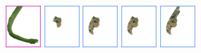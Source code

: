 \begin{figure}[p]
\includegraphics[width=0.118\textwidth]{figs/snake_t3.png}
\includegraphics[width=0.118\textwidth]{figs/bg_t1.png}
\includegraphics[width=0.118\textwidth]{figs/bg_t2.png}
\includegraphics[width=0.118\textwidth]{figs/bg_t2.png}
\includegraphics[width=0.118\textwidth]{figs/bg_t4.png}


\end{figure}
